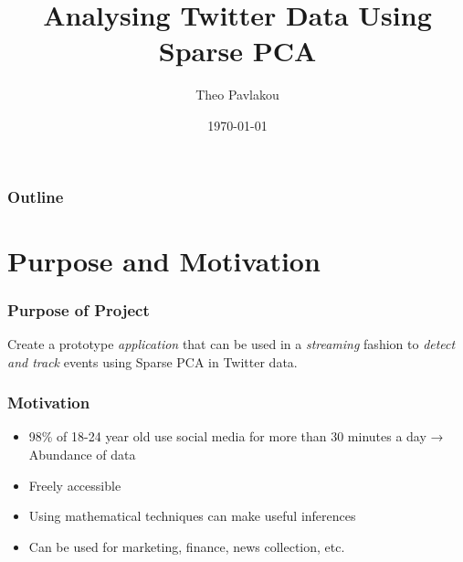 \documentclass{beamer}
\title[Analysing Twitter Data Using Sparse PCA]{Analysing Twitter Data Using Sparse PCA} %
\author{Theo Pavlakou} %
\institute[Imperial College London] %
{
Imperial College London \\ %
\medskip
\textit{theo.pavlakou10@imperial.ac.uk} %
}
\date{\today} %
\begin{document}
\begin{frame}
\titlepage %
\end{frame}

\begin{frame}
\frametitle{Outline} %
\tableofcontents %
\end{frame}


\section{Purpose and Motivation} %


\begin{frame}
\frametitle{Purpose of Project}
Create a prototype \textit{application} that can be used in a \textit{streaming} fashion to \textit{detect and track} events using Sparse PCA in Twitter data.
\end{frame}

\begin{frame}
\frametitle{Motivation}
\begin{itemize}

\item 98\% of 18-24 year old use social media for more than 30 minutes a day → Abundance of data 
\item Freely accessible
\item Using mathematical techniques can make useful inferences
\item Can be used for marketing, finance, news collection, etc.
\end{itemize}
\end{frame}
\end{document}
